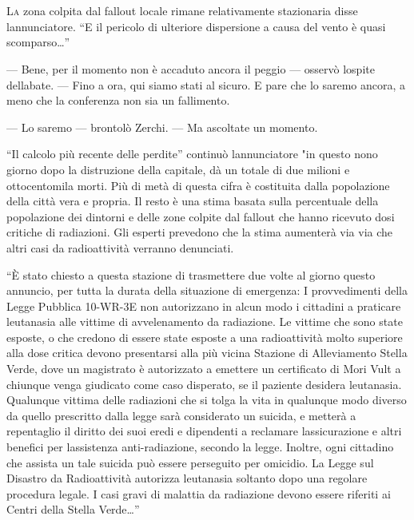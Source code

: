 	\chapter{\phantom{text}}

\lettrine{L}{a} zona colpita dal fallout locale rimane relativamente stazionaria
disse l\textquotesingle annunciatore. ``E il pericolo di ulteriore
dispersione a causa del vento è quasi scomparso\ldots''

--- Bene, per il momento non è accaduto ancora il peggio --- osservò
l\textquotesingle ospite dell\textquotesingle abate. --- Fino a ora, qui
siamo stati al sicuro. E pare che lo saremo ancora, a meno che la
conferenza non sia un fallimento.

--- Lo saremo --- brontolò Zerchi. --- Ma ascoltate un momento.

``Il calcolo più recente delle perdite'' continuò
l\textquotesingle annunciatore "in questo nono giorno dopo la
distruzione della capitale, dà un totale di due milioni e ottocentomila
morti. Più di metà di questa cifra è costituita dalla popolazione della
città vera e propria. Il resto è una stima basata sulla percentuale
della popolazione dei dintorni e delle zone colpite dal fallout che
hanno ricevuto dosi critiche di radiazioni. Gli esperti prevedono che la
stima aumenterà via via che altri casi da radioattività verranno
denunciati.

``È stato chiesto a questa stazione di trasmettere due volte al giorno
questo annuncio, per tutta la durata della situazione di emergenza: I
provvedimenti della Legge Pubblica 10-WR-3E non autorizzano in alcun
modo i cittadini a praticare l\textquotesingle eutanasia alle vittime di
avvelenamento da radiazione. Le vittime che sono state esposte, o che
credono di essere state esposte a una radioattività molto superiore alla
dose critica devono presentarsi alla più vicina Stazione di Alleviamento
Stella Verde, dove un magistrato è autorizzato a emettere un certificato
di Mori Vult a chiunque venga giudicato come caso disperato, se il
paziente desidera l\textquotesingle eutanasia. Qualunque vittima delle
radiazioni che si tolga la vita in qualunque modo diverso da quello
prescritto dalla legge sarà considerato un suicida, e metterà a
repentaglio il diritto dei suoi eredi e dipendenti a reclamare
l\textquotesingle assicurazione e altri benefici per
l\textquotesingle assistenza anti-radiazione, secondo la legge. Inoltre,
ogni cittadino che assista un tale suicida può essere perseguito per
omicidio. La Legge sul Disastro da Radioattività autorizza
l\textquotesingle eutanasia soltanto dopo una regolare procedura legale.
I casi gravi di malattia da radiazione devono essere riferiti ai Centri
della Stella Verde\ldots''

